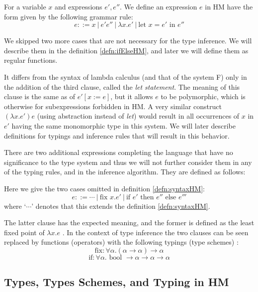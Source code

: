 \begin{defn}[Expression in HM]
    \label{defn:syntaxHM}
    For a variable $x$ and expressions $e', e''$. We define an expression $e$ in HM have the form given by the following grammar rule:
    $$e ::= x\ |\ e' e''\ |\ \lambda x . e'\ |\ \text{let } x = e' \text{ in } e''$$
\end{defn}

We skipped two more cases that are not necessary for the type inference. We will describe them in the definition \ref{defn:ifElseHM}, and later we will define them as regular functions.

It differs from the syntax of lambda calculus (and that of the system F) only in the addition of the third clause, called the \emph{let statement}. The meaning of this clause is the same as of $e' [x := e]$, but it allows $e$ to be polymorphic, which is otherwise for subexpressions forbidden in HM. A very similar construct $(\lambda x . e') e$ (using abstraction instead of \emph{let}) would result in all occurrences of $x$ in $e'$ having the same monomorphic type in this system. We will later describe definitions for typings and inference rules that will result in this behavior.

There are two additional expressions completing the language that have no significance to the type system and thus we will not further consider them in any of the typing rules, and in the inference algorithm. They are defined as follows:

\begin{defn}
    \label{defn:ifElseHM}
    Here we give the two cases omitted in definition \ref{defn:syntaxHM}:
    $$e ::= \cdots\ |\ \text{fix } x . e'\ |\ \text{if } e' \text{ then } e'' \text{ else } e'''$$
    where `$\cdots$' denotes that this extends the definition \ref{defn:syntaxHM}.

    The latter clause has the expected meaning, and the former is defined as the least fixed point of $\lambda x . e$ \cite{milner1978theory}. In the context of type inference the two clauses can be seen replaced by functions (operators) with the following typings (type schemes) \cite{damas1982principal}:
    $$\text{fix}: \forall \alpha . (\alpha \rightarrow \alpha) \rightarrow \alpha$$
    $$\text{if}: \forall \alpha . \text{ bool } \rightarrow \alpha \rightarrow \alpha \rightarrow \alpha$$
\end{defn}

\subsection{Types, Types Schemes, and Typing in HM}

